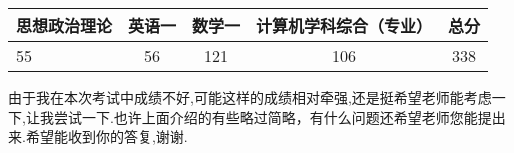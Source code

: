 \documentclass[UTF8,a4paper]{ctexart}
\begin{document}
\begin{table}[hbp]
\centering  %
\begin{tabular}{lcccc}  %
\hline
思想政治理论 & 英语一& 数学一 & 计算机学科综合（专业）& 总分\\ \hline  %
55 &56 &121 &106&338 \\ \hline       %

\end{tabular}
\caption{\color{blue}{初试成绩}}\label{初试成绩}
\end{table}

\indent 由于我在本次考试中成绩不好,可能这样的成绩相对牵强,还是挺希望老师能考虑一下,让我尝试一下.也许上面介绍的有些略过简略，有什么问题还希望老师您能提出来.希望能收到你的答复,谢谢.
\end{document}
